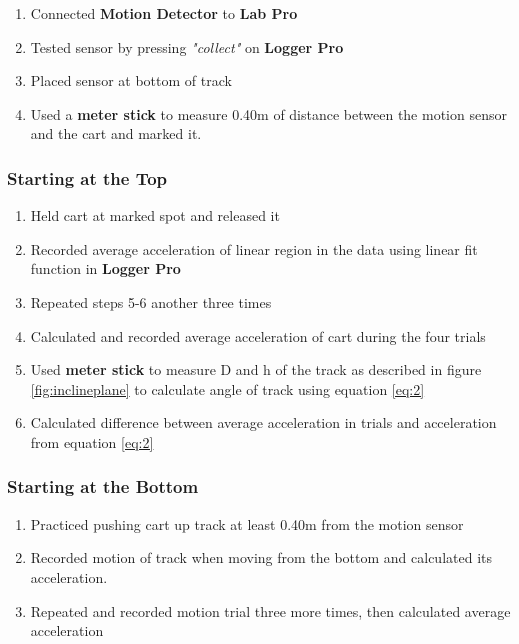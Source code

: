 \documentclass[a4paper,12pt]{article}
\begin{document}
	\begin{enumerate}
		\item Connected \textbf{Motion Detector} to \textbf{Lab Pro} 
		\item Tested sensor by pressing \textit{"collect"} on \textbf{Logger Pro}
		\item Placed sensor at bottom of track
		\item Used a \textbf{meter stick} to measure 0.40\thinspace m of distance between the motion sensor and the cart and marked it.
	\end{enumerate}

\subsubsection{Starting at the Top}

	\begin{enumerate}[resume]

	\item Held cart at marked spot and released it
	\item Recorded average acceleration of linear region in the data using linear fit function in \textbf{Logger Pro}
	\item Repeated steps 5-6 another three times 
	\item Calculated and recorded average acceleration of cart during the four trials
	\item Used \textbf{meter stick} to measure D and h of the track as described in figure \ref{fig:inclineplane} to calculate angle of track using equation \eqref{eq:2}
	\item Calculated difference between average acceleration in trials and acceleration from equation \eqref{eq:2}
	\end{enumerate}

	\subsubsection{Starting at the Bottom}

	\begin{enumerate}[resume]
			\item Practiced pushing cart up track at least 0.40\thinspace m from the motion sensor
			\item Recorded motion of track when moving from the bottom and calculated its acceleration.
			\item Repeated and recorded motion trial three more times, then calculated average acceleration
		\end{enumerate}
\end{document}
